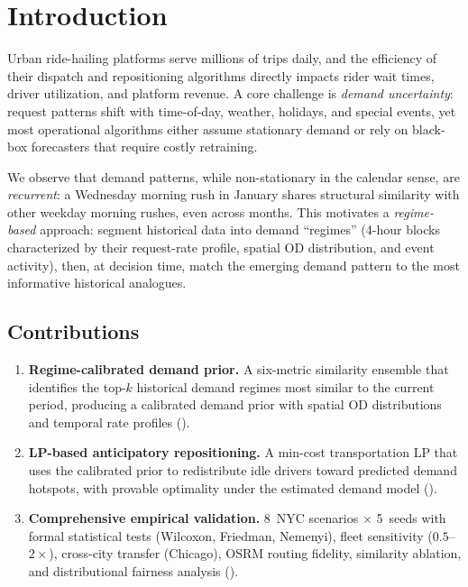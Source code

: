 \documentclass[conference,10pt]{IEEEtran}
\begin{document}
\section{Introduction}
\label{sec:intro}

Urban ride-hailing platforms serve millions of trips daily, and the efficiency
of their dispatch and repositioning algorithms directly impacts rider wait
times, driver utilization, and platform revenue. A core challenge is
\emph{demand uncertainty}: request patterns shift with time-of-day, weather,
holidays, and special events, yet most operational algorithms either assume
stationary demand or rely on black-box forecasters that require costly
retraining.

We observe that demand patterns, while non-stationary in the calendar sense,
are \emph{recurrent}: a Wednesday morning rush in January shares structural
similarity with other weekday morning rushes, even across months. This
motivates a \emph{regime-based} approach: segment historical data into
demand ``regimes'' (4-hour blocks characterized by their request-rate
profile, spatial OD distribution, and event activity), then, at decision
time, match the emerging demand pattern to the most informative historical
analogues.

\subsection{Contributions}

\begin{enumerate}
  \item \textbf{Regime-calibrated demand prior.} A six-metric similarity
    ensemble that identifies the top-$k$ historical demand regimes most
    similar to the current period, producing a calibrated demand prior with
    spatial OD distributions and temporal rate profiles ().

  \item \textbf{LP-based anticipatory repositioning.} A min-cost
    transportation LP that uses the calibrated prior to redistribute idle
    drivers toward predicted demand hotspots, with provable optimality
    under the estimated demand model ().

  \item \textbf{Comprehensive empirical validation.} 8~NYC scenarios
    $\times$ 5~seeds with formal statistical tests (Wilcoxon, Friedman,
    Nemenyi), fleet sensitivity ($0.5$--$2\times$), cross-city transfer
    (Chicago), OSRM routing fidelity, similarity ablation, and
    distributional fairness analysis ().
\end{enumerate}
\end{document}
